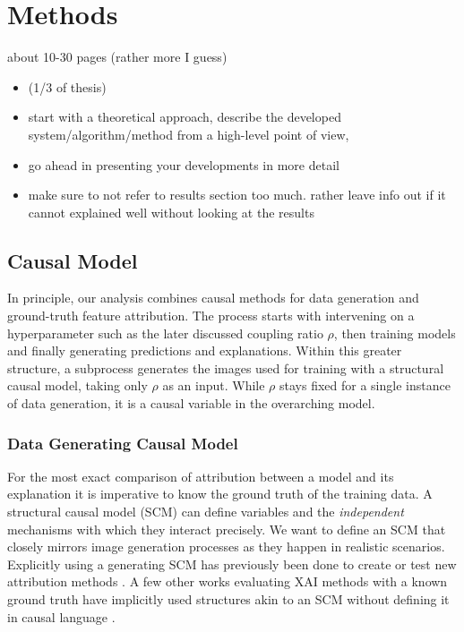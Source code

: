 \chapter{Methods}\label{chapter:method}

{ \color{red}

    about 10-30 pages (rather more I guess)

    \begin{itemize}
        \item (1/3 of thesis)
        \item start with a theoretical approach, describe the developed system/algorithm/method from a high-level point of view,
        \item go ahead in presenting your developments in more detail
        \item make sure to not refer to results section too much. rather leave info out if it cannot explained well without looking at the results
    \end{itemize}
}

\section{Causal Model}
In principle, our analysis combines causal methods for data generation and ground-truth feature attribution. 
The process starts with intervening on a hyperparameter such as the later discussed coupling ratio $\rho$, then training models and finally generating predictions and explanations. 
Within this greater structure, a subprocess generates the images used for training with a structural causal model, taking only $\rho$ as an input. While $\rho$ stays fixed for a single instance of data generation, it is a causal variable in the overarching model. 

\subsection{Data Generating Causal Model}
For the most exact comparison of attribution between a model and its explanation it is imperative to know the ground truth of the training data. A structural causal model (SCM) can define variables and the \textit{independent} mechanisms with which they interact precisely. We want to define an SCM that closely mirrors image generation processes as they happen in realistic scenarios. 
Explicitly using a generating SCM has previously been done to create or test new attribution methods \cite{Parafita2019, Wilming2023,Clark2023, Goyal2019, Reimers2019, Reimers2020}. A few other works evaluating XAI methods with a known ground truth have implicitly used structures akin to an SCM without defining it in causal language \cite{Kim2018, Yang2019,Arras2022}. 

